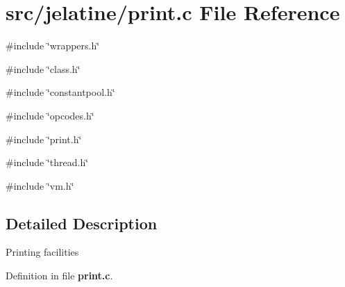 \section{src/jelatine/print.c File Reference}
\label{print_8c}
{\ttfamily \#include \char`\"{}wrappers.h\char`\"{}}\par
{\ttfamily \#include \char`\"{}class.h\char`\"{}}\par
{\ttfamily \#include \char`\"{}constantpool.h\char`\"{}}\par
{\ttfamily \#include \char`\"{}opcodes.h\char`\"{}}\par
{\ttfamily \#include \char`\"{}print.h\char`\"{}}\par
{\ttfamily \#include \char`\"{}thread.h\char`\"{}}\par
{\ttfamily \#include \char`\"{}vm.h\char`\"{}}\par


\subsection{Detailed Description}
Printing facilities 

Definition in file {\bf print.c}.

